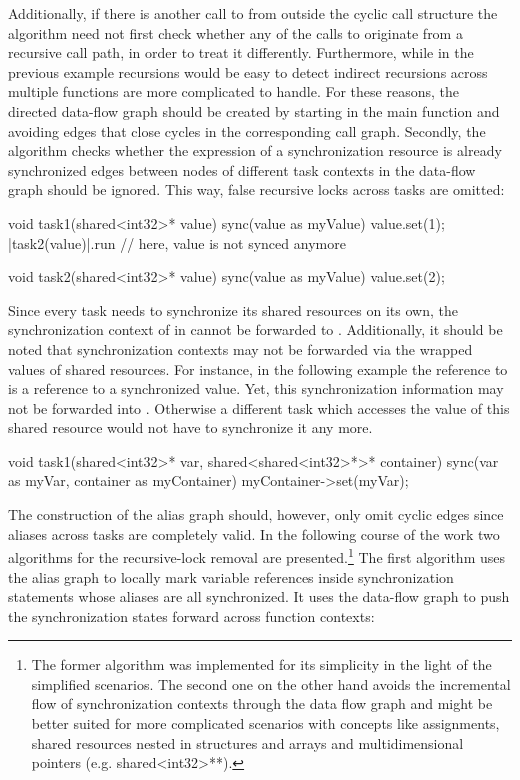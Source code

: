 Additionally, if there is another call to  from outside the cyclic call structure the algorithm need not first check whether any of the calls to  originate from a recursive call path, in order to treat it differently. Furthermore, while in the previous example recursions would be easy to detect indirect recursions across multiple functions are more complicated to handle. For these reasons, the directed data-flow graph should be created by starting in the main function and avoiding edges that close cycles in the corresponding call graph. Secondly, the algorithm checks whether the expression of a synchronization resource is already synchronized edges between nodes of different task contexts in the data-flow graph should be ignored. This way, false recursive locks across tasks are omitted:
\begin{ccode}
void task1(shared<int32>* value) {
  sync(value as myValue) { value.set(1); 
    |task2(value)|.run                   // here, value is not synced anymore
  }
}

void task2(shared<int32>* value) {
  sync(value as myValue) { value.set(2); }
}
\end{ccode}
Since every task needs to synchronize its shared resources on its own, the synchronization context of  in  cannot be forwarded to . Additionally, it should be noted that synchronization contexts may not be forwarded via the wrapped values of shared resources. For instance, in the following example the reference to  is a reference to a synchronized value. Yet, this synchronization information may not be forwarded into . Otherwise a different task which accesses the value of this shared resource would not have to synchronize it any more.
\begin{ccode}
void task1(shared<int32>* var, shared<shared<int32>*>* container) {
  sync(var as myVar, container as myContainer) {
    myContainer->set(myVar);
  }
}
\end{ccode}
The construction of the alias graph should, however, only omit cyclic edges since aliases across tasks are completely valid. In the following course of the work two algorithms for the recursive-lock removal are presented.\footnote{The former algorithm was implemented for its simplicity in the light of the simplified scenarios. The second one on the other hand avoids the incremental flow of synchronization contexts through the data flow graph and might be better suited for more complicated scenarios with concepts like assignments, shared resources nested in structures and arrays and multidimensional pointers (e.g. shared<int32>**).} The first algorithm uses the alias graph to locally mark variable references inside synchronization statements whose aliases are all synchronized. It uses the data-flow graph to push the synchronization states forward across function contexts:

